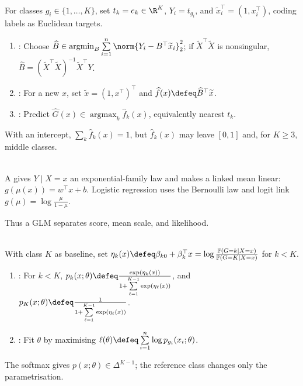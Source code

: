 \begin{method} \label{meth:sl-indicator-matrix-regression-classifier} \\
For classes $g_i\in\{1,\ldots,K\}$, set $t_k=e_k\in\R^K$, $Y_i=t_{g_i}$, and $\widetilde{x}_i^\top=(1,x_i^\top)$, coding labels as Euclidean targets.
\begin{enumerate}[label=(\roman*)]
\setlength{\itemsep}{0pt}
\item {}: Choose $\widehat{B}\in\operatorname*{argmin}_B\sum\limits_{i=1}^{n}\norm{Y_i-B^\top\widetilde{x}_i}_2^2$; if $\widetilde{X}^\top\widetilde{X}$ is nonsingular, $\widehat{B}=(\widetilde{X}^\top\widetilde{X})^{-1}\widetilde{X}^\top Y$.
\item {}: For a new $x$, set $\widetilde{x}=(1,x^\top)^\top$ and $\widehat{f}(x)\defeq\widehat{B}^\top\widetilde{x}$.
\item {}: Predict $\widehat{G}(x)\in\operatorname*{argmax}_k\widehat{f}_k(x)$, equivalently nearest $t_k$.
\end{enumerate}
With an intercept, $\sum_k\widehat{f}_k(x)=1$, but $\widehat{f}_k(x)$ may leave $[0,1]$ and, for $K\geq3$,  middle classes.
\end{method}

\begin{definition} \label{def:sl-generalized-linear-model} \\
A  gives $Y\mid X=x$ an exponential-family law and makes a linked mean linear:\\
$g(\mu(x))=w^\top x+b$. Logistic regression uses the Bernoulli law and logit link $g(\mu)=\log\frac{\mu}{1-\mu}$.
\end{definition}

Thus a GLM separates score, mean scale, and likelihood.

\begin{definition} \label{def:sl-multiclass-logistic-regression} \\
With class $K$ as baseline, set $\eta_k(x)\defeq\beta_{k0}+\beta_k^\top x=\log\frac{\mathbb{P}(G=k\mid X=x)}{\mathbb{P}(G=K\mid X=x)}$ for $k<K$.
\begin{enumerate}[label=(\roman*)]
\setlength{\itemsep}{0pt}
\item {}: For $k<K$, $p_k(x;\theta)\defeq\frac{\exp(\eta_k(x))}{1+\sum\limits_{\ell=1}^{K-1}\exp(\eta_\ell(x))}$, and $p_K(x;\theta)\defeq\frac{1}{1+\sum\limits_{\ell=1}^{K-1}\exp(\eta_\ell(x))}$.
\item {}: Fit $\theta$ by maximising $\ell(\theta)\defeq\sum\limits_{i=1}^{n}\log p_{g_i}(x_i;\theta)$.
\end{enumerate}
The softmax gives $p(x;\theta)\in\Delta^{K-1}$; the reference class changes only the parametrisation.
\end{definition}

